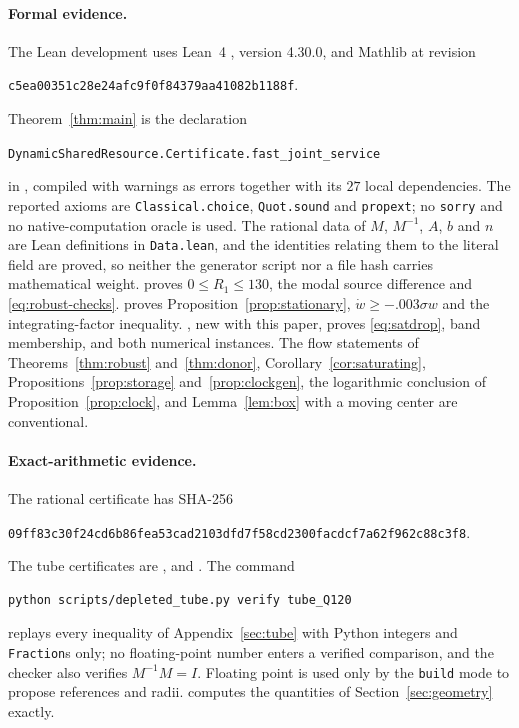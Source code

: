 \documentclass[11pt,a4paper]{article}
\theoremstyle{plain}
\theoremstyle{definition}
\theoremstyle{remark}
\begin{document}
\paragraph{Formal evidence.}
The Lean development uses Lean~4 \citep{moura2021}, version 4.30.0, and Mathlib
\citep{mathlib2020} at revision
\begin{center}\small\texttt{c5ea00351c28e24afc9f0f84379aa41082b1188f}.\end{center}
Theorem~\ref{thm:main} is the declaration
\begin{center}\small\texttt{DynamicSharedResource.Certificate.fast\_joint\_service}\end{center}
in , compiled with
warnings as errors together with its $27$ local dependencies. The reported
axioms are \texttt{Classical.choice}, \texttt{Quot.sound} and \texttt{propext};
no \texttt{sorry} and no native-computation oracle is used. The rational data
of $M$, $M^{-1}$, $A$, $b$ and $n$ are Lean definitions in \texttt{Data.lean},
and the identities relating them to the literal field are proved, so neither
the generator script nor a file hash carries mathematical weight.
 proves $0\le R_1\le130$, the modal source
difference and \eqref{eq:robust-checks}.  proves
Proposition~\ref{prop:stationary}, $\dot w\ge-.003\sigma w$ and the
integrating-factor inequality. , new with this
paper, proves \eqref{eq:satdrop}, band membership, and both numerical
instances. The flow statements of Theorems~\ref{thm:robust}
and~\ref{thm:donor}, Corollary~\ref{cor:saturating},
Propositions~\ref{prop:storage} and~\ref{prop:clockgen}, the logarithmic conclusion
of Proposition~\ref{prop:clock}, and Lemma~\ref{lem:box} with a moving center are
conventional.

\paragraph{Exact-arithmetic evidence.}
The rational certificate  has SHA-256
\begin{center}\small\texttt{09ff83c30f24cd6b86fea53cad2103dfd7f58cd2300facdcf7a62f962c88c3f8}.\end{center}
The tube certificates are ,
 and . The command
\begin{verbatim}
python scripts/depleted_tube.py verify tube_Q120
\end{verbatim}
replays every inequality of Appendix~\ref{sec:tube} with Python integers and
\texttt{Fraction}s only; no floating-point number enters a verified
comparison, and the checker also verifies $M^{-1}M=I$. Floating point is used
only by the \texttt{build} mode to propose references and radii.
 computes the quantities of
Section~\ref{sec:geometry} exactly.
\end{document}
